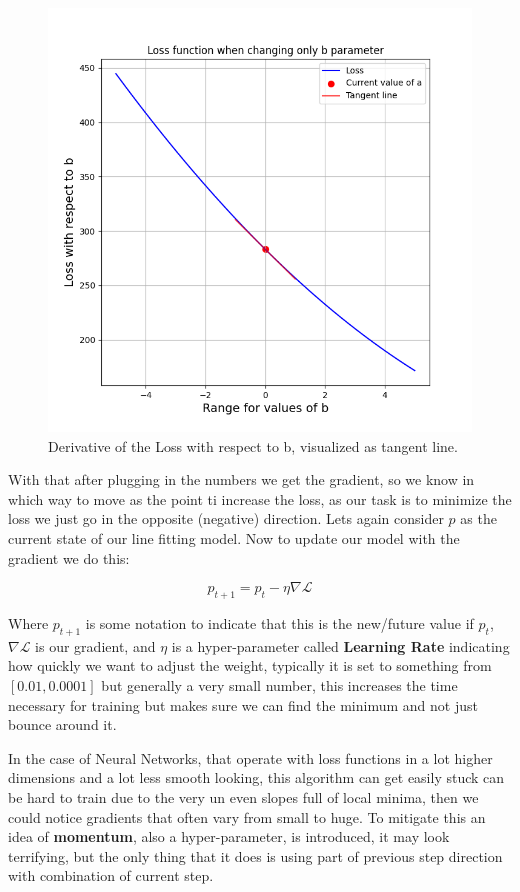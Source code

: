\documentclass{article}
\begin{document}
\begin{figure}[h]
\begin{minipage}{0.4\textwidth}
        \includegraphics[width=\linewidth]{../images/myplot10.png}
        \caption{Derivative of the Loss with respect to b, visualized as tangent line.}
    \end{minipage}
\end{figure}

With that after plugging in the numbers we get the gradient, so we know in which way to move as the point ti increase the loss, as our task is to minimize the loss we just go in the opposite (negative) direction. Lets again consider $p$ as the current state of our line fitting model. Now to update our model with the gradient we do this:

\begin{equation}
    p_{t+1} = p_t - \eta\nabla\mathcal L
\end{equation}

Where $p_{t+1}$ is some notation to indicate that this is the new/future value if $p_t$, $\nabla\mathcal L$ is our gradient, and $\eta$ is a hyper-parameter called \textbf{Learning Rate} indicating how quickly we want to adjust the weight, typically it is set to something from $\left[0.01, 0.0001\right]$ but generally a very small number, this increases the time necessary for training but makes sure we can find the minimum and not just bounce around it.

In the case of Neural Networks, that operate with loss functions in a lot higher dimensions and a lot less smooth looking, this algorithm can get easily stuck can be hard to train due to the very un even slopes full of local minima, then we could notice gradients that often vary from small to huge. To mitigate this an idea of \textbf{momentum}, also a hyper-parameter, is introduced, it may look terrifying, but the only thing that it does is using part of previous step direction with combination of current step.
\end{document}
